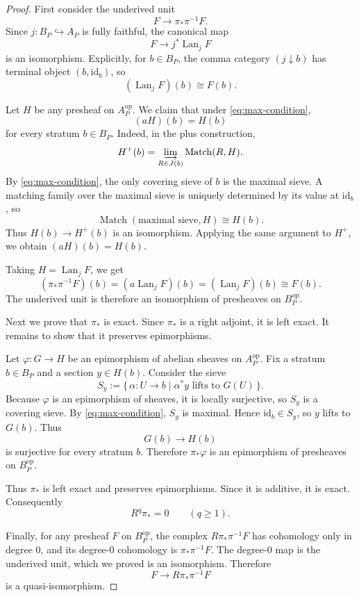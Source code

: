 \documentclass[12pt]{article}
\theoremstyle{definition}
\theoremstyle{remark}
\numberwithin{equation}{section}
\newcommand{\op}{\mathrm{op}}
\newcommand{\id}{\mathrm{id}}
\newcommand{\Lan}{\operatorname{Lan}}
\newcommand{\Match}{\operatorname{Match}}
\begin{document}
\begin{proof}
First consider the underived unit
\[
F\longrightarrow \pi_*\pi^{-1}F.
\]
Since \(j:B_P\hookrightarrow A_P\) is fully faithful, the canonical map
\[
F\longrightarrow j^*\Lan_jF
\]
is an isomorphism.  Explicitly, for \(b\in B_P\), the comma category \((j\downarrow b)\) has terminal object \((b,\id_b)\), so
\[
(\Lan_jF)(b)\cong F(b).
\]

Let \(H\) be any presheaf on \(A_P^{\op}\).  We claim that under \eqref{eq:max-condition},
\[
(aH)(b)=H(b)
\]
for every stratum \(b\in B_P\).  Indeed, in the plus construction,
\[
H^+(b)=\varinjlim_{R\in J(b)} \Match(R,H).
\]
By \eqref{eq:max-condition}, the only covering sieve of \(b\) is the maximal sieve.  A matching family over the maximal sieve is uniquely determined by its value at \(\id_b\), so
\[
\Match(\text{maximal sieve},H)\cong H(b).
\]
Thus \(H(b)\to H^+(b)\) is an isomorphism.  Applying the same argument to \(H^+\), we obtain \((aH)(b)=H(b)\).

Taking \(H=\Lan_jF\), we get
\[
(\pi_*\pi^{-1}F)(b)
=(a\Lan_jF)(b)
=(\Lan_jF)(b)
\cong F(b).
\]
The underived unit is therefore an isomorphism of presheaves on \(B_P^{\op}\).

Next we prove that \(\pi_*\) is exact.  Since \(\pi_*\) is a right adjoint, it is left exact.  It remains to show that it preserves epimorphisms.

Let \(\varphi:G\to H\) be an epimorphism of abelian sheaves on \(A_P^{\op}\).  Fix a stratum \(b\in B_P\) and a section \(y\in H(b)\).  Consider the sieve
\[
S_y:=\{\, \alpha:U\to b \mid \alpha^*y\text{ lifts to }G(U)\,\}.
\]
Because \(\varphi\) is an epimorphism of sheaves, it is locally surjective, so \(S_y\) is a covering sieve.  By \eqref{eq:max-condition}, \(S_y\) is maximal.  Hence \(\id_b\in S_y\), so \(y\) lifts to \(G(b)\).  Thus
\[
G(b)\longrightarrow H(b)
\]
is surjective for every stratum \(b\).  Therefore \(\pi_*\varphi\) is an epimorphism of presheaves on \(B_P^{\op}\).

Thus \(\pi_*\) is left exact and preserves epimorphisms.  Since it is additive, it is exact.  Consequently
\[
R^q\pi_*=0\qquad(q\geq 1).
\]

Finally, for any presheaf \(F\) on \(B_P^{\op}\), the complex \(R\pi_*\pi^{-1}F\) has cohomology only in degree \(0\), and its degree-\(0\) cohomology is \(\pi_*\pi^{-1}F\).  The degree-\(0\) map is the underived unit, which we proved is an isomorphism.  Therefore
\[
F\longrightarrow R\pi_*\pi^{-1}F
\]
is a quasi-isomorphism.
\end{proof}
\end{document}
